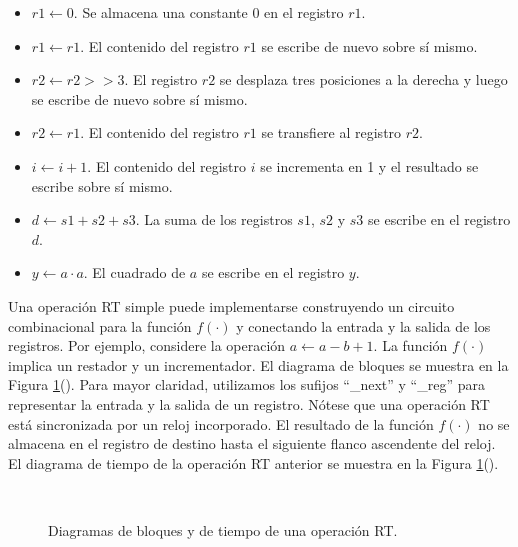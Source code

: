     \begin{itemize}
      \item $r1 \leftarrow 0$. Se almacena una constante 0 en el registro $r1$.
      \item $r1 \leftarrow r1$. El contenido del registro $r1$ se escribe de nuevo sobre sí mismo.
      \item $r2 \leftarrow r2 >> 3$. El registro $r2$ se desplaza tres posiciones a la derecha y luego se escribe de nuevo sobre sí mismo.
      \item $r2 \leftarrow r1$. El contenido del registro $r1$ se transfiere al registro $r2$.
      \item $i \leftarrow i + 1$. El contenido del registro $i$ se incrementa en 1 y el resultado se escribe sobre sí mismo.
      \item $d \leftarrow s1 + s2 + s3$. La suma de los registros $s1$, $s2$ y $s3$ se escribe en el registro $d$.
      \item $y \leftarrow a \cdot a$. El cuadrado de $a$ se escribe en el registro $y$.
    \end{itemize}

     Una operación RT simple puede implementarse construyendo un circuito combinacional para la función $f(\cdot)$ y conectando la entrada y la salida de los registros. Por ejemplo, considere la operación $a \leftarrow a - b + 1$. La función $f(\cdot)$ implica un restador y un incrementador. El diagrama de bloques se muestra en la Figura \ref{fig:rt_figure}(). Para mayor claridad, utilizamos los sufijos ``\_next'' y ``\_reg'' para representar la entrada y la salida de un registro. Nótese que una operación RT está sincronizada por un reloj incorporado. El resultado de la función $f(\cdot)$ no se almacena en el registro de destino hasta el siguiente flanco ascendente del reloj. El diagrama de tiempo de la operación RT anterior se muestra en la Figura \ref{fig:rt_figure}().

    \begin{figure}[!h]
        \centering
        \\
        \caption{Diagramas de bloques y de tiempo de una operación RT.}
        \label{fig:rt_figure}
    \end{figure}

